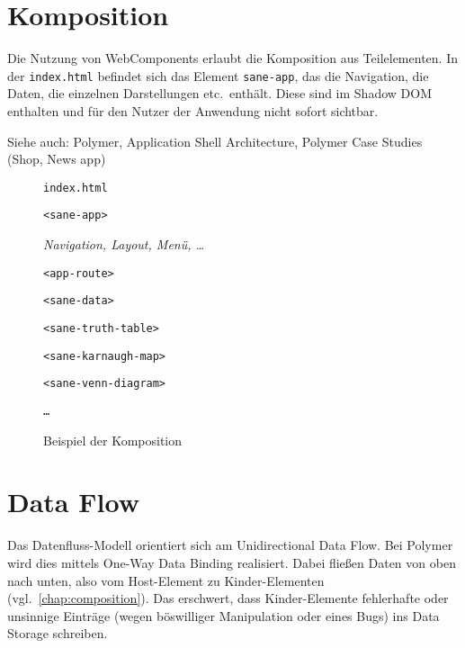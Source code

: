 \documentclass{scrartcl}
\begin{document}
\section{Komposition}
\label{chap:composition}
Die Nutzung von WebComponents erlaubt die Komposition aus Teilelementen.
In der \texttt{index.html} befindet sich das Element \texttt{sane-app}, das die Navigation, die Daten, die einzelnen Darstellungen etc.\ enthält.
Diese sind im Shadow DOM enthalten und für den Nutzer der Anwendung nicht sofort sichtbar.

Siehe auch: Polymer, Application Shell Architecture, Polymer Case Studies (Shop, News app)

\begin{figure}
\begin{framed}
	\texttt{index.html}
	\begin{shaded*}
		\texttt{<sane-app>}
		\begin{shaded*}
			\textit{Navigation, Layout, Menü, \ldots}
		\end{shaded*}
		\begin{shaded*}
			\texttt{<app-route>}
		\end{shaded*}
		\begin{shaded*}
			\texttt{<sane-data>}
		\end{shaded*}
		\begin{shaded*}
			\texttt{<sane-truth-table>}
		\end{shaded*}
		\begin{shaded*}
			\texttt{<sane-karnaugh-map>}
		\end{shaded*}
		\begin{shaded*}
			\texttt{<sane-venn-diagram>}
		\end{shaded*}
		\begin{shaded*}
			\texttt{\ldots}
		\end{shaded*}
	\end{shaded*}
\end{framed}
\caption{Beispiel der Komposition}
\end{figure}

\section{Data Flow}
Das Datenfluss-Modell orientiert sich am Unidirectional Data Flow.
Bei Polymer wird dies mittels One-Way Data Binding realisiert.
Dabei fließen Daten von oben nach unten, also vom Host-Element zu Kinder-Elementen (vgl.~\autoref{chap:composition}).
Das erschwert, dass Kinder-Elemente fehlerhafte oder unsinnige Einträge (wegen böswilliger Manipulation oder eines Bugs) ins Data Storage schreiben.
\end{document}
